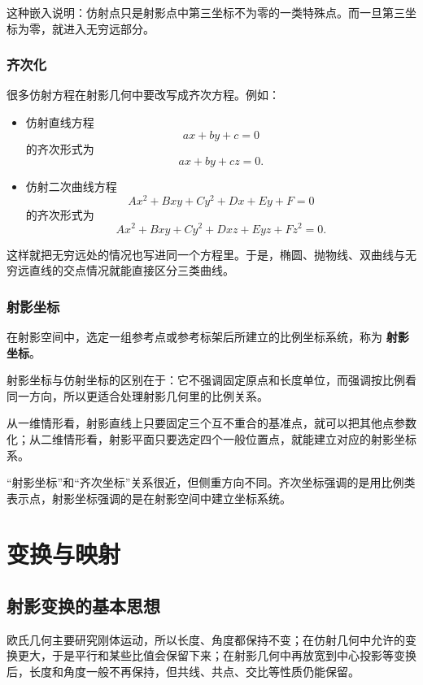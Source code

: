 这种嵌入说明：仿射点只是射影点中第三坐标不为零的一类特殊点。而一旦第三坐标为零，就进入无穷远部分。

\subsection{齐次化}
很多仿射方程在射影几何中要改写成齐次方程。例如：

\begin{itemize}
    \item 仿射直线方程
    \[
    ax+by+c=0
    \]
    的齐次形式为
    \[
    ax+by+cz=0.
    \]
    \item 仿射二次曲线方程
    \[
    Ax^2+Bxy+Cy^2+Dx+Ey+F=0
    \]
    的齐次形式为
    \[
    Ax^2+Bxy+Cy^2+Dxz+Eyz+Fz^2=0.
    \]
\end{itemize}

这样就把无穷远处的情况也写进同一个方程里。于是，椭圆、抛物线、双曲线与无穷远直线的交点情况就能直接区分三类曲线。

\subsection{射影坐标}
\begin{definition}
在射影空间中，选定一组参考点或参考标架后所建立的比例坐标系统，称为 \textbf{射影坐标}。
\end{definition}

射影坐标与仿射坐标的区别在于：它不强调固定原点和长度单位，而强调按比例看同一方向，所以更适合处理射影几何里的比例关系。

从一维情形看，射影直线上只要固定三个互不重合的基准点，就可以把其他点参数化；从二维情形看，射影平面只要选定四个一般位置点，就能建立对应的射影坐标系。

\vspace{0.5em}
\begin{remark}
“射影坐标”和“齐次坐标”关系很近，但侧重方向不同。齐次坐标强调的是用比例类表示点，射影坐标强调的是在射影空间中建立坐标系统。
\end{remark}

\chapter{变换与映射}

\section{射影变换的基本思想}
欧氏几何主要研究刚体运动，所以长度、角度都保持不变；在仿射几何中允许的变换更大，于是平行和某些比值会保留下来；在射影几何中再放宽到中心投影等变换后，长度和角度一般不再保持，但共线、共点、交比等性质仍能保留。

